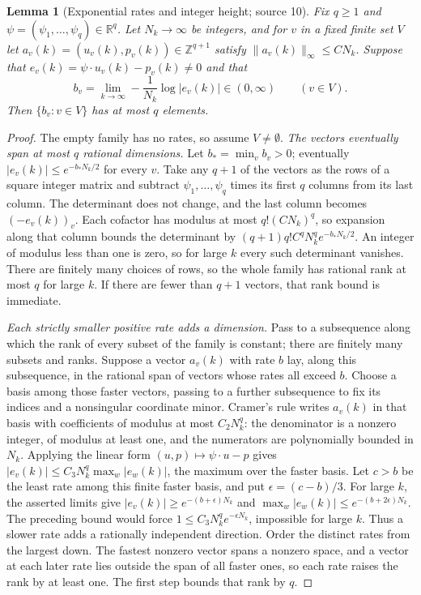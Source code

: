 \documentclass[11pt,letterpaper]{article}
\newtheorem{lemma}[lemma]{Lemma}
\theoremstyle{definition}
\theoremstyle{remark}
\newcommand{\R}{\mathbb R}
\newcommand{\Z}{\mathbb Z}
\numberwithin{equation}{section}
\begin{document}
\begin{lemma}[Exponential rates and integer height; source 10]
\label{dyn:nsc:lem:height}
Fix $q\ge1$ and $\psi=(\psi_1,\dots,\psi_q)\in\R^{q}$. Let
$N_k\to\infty$ be integers, and for $v$ in a fixed finite set $V$ let
$a_v(k)=(u_v(k),p_v(k))\in\Z^{q+1}$ satisfy
$\|a_v(k)\|_\infty\le CN_k$. Suppose that
$e_v(k)=\psi\cdot u_v(k)-p_v(k)\ne0$ and that
\[
 b_v=\lim_{k\to\infty}-\frac1{N_k}\log|e_v(k)|\in(0,\infty)
 \qquad(v\in V).
\]
Then $\{b_v:v\in V\}$ has at most $q$ elements.
\end{lemma}
\begin{proof}
The empty family has no rates, so assume $V\ne\emptyset$.
\emph{The vectors eventually span at most $q$ rational dimensions.} Let
$b_*=\min_vb_v>0$; eventually $|e_v(k)|\le e^{-b_*N_k/2}$ for every $v$.
Take any $q+1$ of the vectors as the rows of a square integer matrix and
subtract $\psi_1,\dots,\psi_q$ times its first $q$ columns from its last
column. The determinant does not change, and the last column becomes
$(-e_v(k))_v$. Each cofactor has modulus at most $q!(CN_k)^q$,
so expansion along that column bounds the determinant by
$(q+1)q!C^qN_k^{q}e^{-b_*N_k/2}$. An integer of
modulus less than one is zero, so for large $k$ every such determinant
vanishes. There are finitely many choices of rows, so the whole family has
rational rank at most $q$ for large $k$. If there are fewer than $q+1$
vectors, that rank bound is immediate.

\emph{Each strictly smaller positive rate adds a dimension.} Pass to a
subsequence along which the rank of every subset of the family is constant;
there are finitely many subsets and ranks. Suppose a vector $a_v(k)$ with
rate $b$ lay, along this subsequence, in the rational span of vectors whose
rates all exceed $b$. Choose a basis among those faster vectors, passing to
a further subsequence to fix its indices and a nonsingular coordinate minor.
Cramer's rule writes $a_v(k)$ in that basis with coefficients of modulus at
most $C_2N_k^{q}$: the denominator is a nonzero integer, of modulus at least
one, and the numerators are polynomially bounded in $N_k$. Applying the
linear form $(u,p)\mapsto\psi\cdot u-p$ gives
$|e_v(k)|\le C_3N_k^{q}\max_w|e_w(k)|$, the maximum over the faster basis.
Let $c>b$ be the least rate among this finite faster basis, and put
$\epsilon=(c-b)/3$. For large $k$, the asserted limits give
$|e_v(k)|\ge e^{-(b+\epsilon)N_k}$ and
$\max_w|e_w(k)|\le e^{-(b+2\epsilon)N_k}$. The preceding bound would
force $1\le C_3N_k^qe^{-\epsilon N_k}$, impossible for large $k$.
Thus a slower rate adds a rationally independent direction. Order the distinct rates from
the largest down. The fastest nonzero vector spans a nonzero space, and a
vector at each later rate lies outside the span of all faster ones, so each
rate raises the rank by at least one. The first step bounds that rank by
$q$.
\end{proof}
\end{document}
